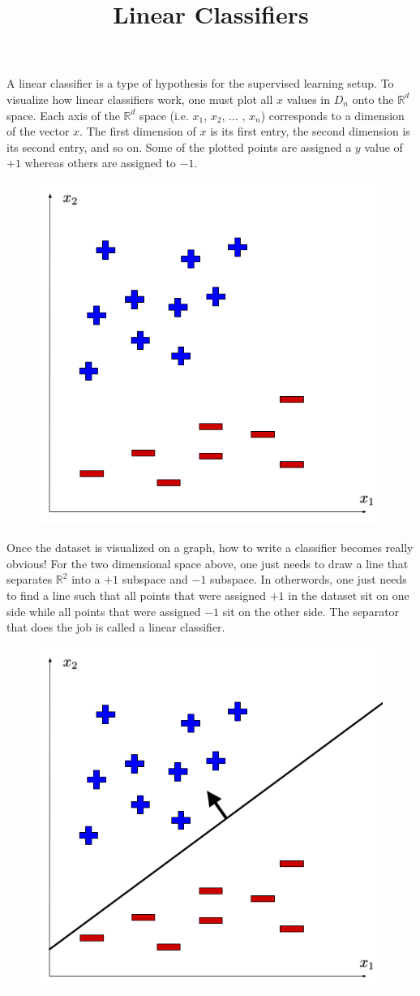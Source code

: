 \documentclass{article}
\title{Linear Classifiers}
\author{ }
\date{ }
\begin{document}
	
	\maketitle 
	
	A linear classifier is a type of hypothesis for the supervised learning setup. To visualize how linear classifiers work, one must plot all $x$ values in $D_n$ onto the $\mathbb{R}^d$ space. Each axis of the $\mathbb{R}^d$ space (i.e. $x_1$, $x_2$, ... , $x_n$) corresponds to a dimension of the vector $x$. The first dimension of $x$ is its first entry, the second dimension is its second entry, and so on. Some of the plotted points are assigned a $y$ value of $+1$ whereas others are assigned to $-1$.\\
	
    \begin{figure}[H]
        \centering
        \includegraphics[width=0.5\linewidth]{Plotted X Values.png}
    \end{figure}
	
	Once the dataset is visualized on a graph, how to write a classifier becomes really obvious! For the two dimensional space above, one just needs to draw a line that separates $\mathbb{R}^2$ into a $+1$ subspace and $-1$ subspace. In otherwords, one just needs to find a line such that all points that were assigned $+1$ in the dataset sit on one side while all points that were assigned $-1$ sit on the other side. The separator that does the job is called a linear classifier. \\
	
    \begin{figure}[H]
        \centering
        \includegraphics[width=0.5\linewidth]{Classified X Values.png}
    \end{figure}
    		
\end{document}
